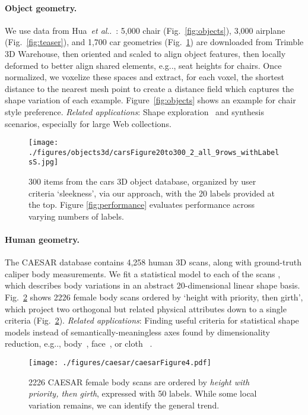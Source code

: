 \documentclass{article}
\makeatletter
\DeclareRobustCommand\onedot{\futurelet\@let@token\@onedot}
\def\@onedot{\ifx\@let@token.\else.\null\fi\xspace}
\def\eg{{e.g}\onedot} \def\Eg{{E.g}\onedot}
\def\etal{\emph{et al}\onedot}
\makeatother
\begin{document}
\paragraph{Object geometry.} We use data from Hua~\etal~\cite{HuaSuGui13}: 5,000 chair (Fig.~\ref{fig:objects}), 3,000 airplane (Fig.~\ref{fig:teaser}), and 1,700 car geometries (Fig.~\ref{fig:cars}) are downloaded from Trimble 3D Warehouse, then oriented and scaled to align object features, then locally deformed to better align shared elements, \eg, seat heights for chairs. Once normalized, we voxelize these spaces and extract, for each voxel, the shortest distance to the nearest mesh point to create a distance field which captures the shape variation of each example. Figure~\ref{fig:objects} shows an example for chair style preference. \emph{Related applications}: Shape exploration~\cite{HuaSuGui13} and synthesis~\cite{Maks11} scenarios, especially for large Web collections. 

\begin{figure}[t]
		\texttt{[image: ./figures/objects3d/carsFigure20to300\_2\_all\_9rows\_withLabelsS.jpg]}
    \caption{300 items from the cars 3D object database, organized by user criteria `sleekness', via our approach, with the 20 labels provided at the top. Figure \ref{fig:performance} evaluates performance across varying numbers of labels.}
    \label{fig:cars}
\end{figure}

\paragraph{Human geometry.} The CAESAR database contains 4,258 human 3D scans, along with ground-truth caliper body measurements. We fit a statistical model to each of the scans \cite{pishchulin15arxiv}, which describes body variations in an abstract 20-dimensional linear shape basis. Fig.~\ref{figa:caesar} shows 2226 female body scans ordered by `height with priority, then girth', which project two orthogonal but related physical attributes down to a single criteria (Fig.~\ref{figa:caesar}).
\emph{Related applications}: Finding useful criteria for statistical shape models instead of semantically-meaningless axes found by dimensionality reduction, \eg, body~\cite{Hasler2009}, face~\cite{Vlasic2005}, or cloth ~\cite{DRAPE2012}.

\begin{figure}[t]
\centering
\texttt{[image: ./figures/caesar/caesarFigure4.pdf]}
\caption{2226 CAESAR female body scans are ordered by \emph{height with priority, then girth}, expressed with 50 labels. While some local variation remains, we can identify the general trend.}
\label{figa:caesar}
\end{figure}
\end{document}

